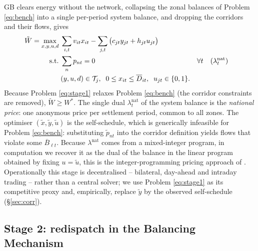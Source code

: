 \documentclass[review,3p,times]{elsarticle}
\theoremstyle{plain}
\theoremstyle{definition}
\begin{document}
GB clears energy without the network, collapsing the zonal balances of
Problem \eqref{eq:bench} into a single per-period system balance, and dropping the
corridors and their flows, gives
\begin{align}
\tilde W=\max_{x,y,u,d}\;& \sum_{i,t} v_{it}x_{it}-\sum_{j,t}\big(c_{jt}y_{jt}+h_{jt}u_{jt}\big)
\label{eq:stage1}\\
\text{s.t.}\;& \sum_{n} p_{nt}=0
   && \forall t\quad(\lambda^{\mathrm{nat}}_t) \notag\\
& (y,u,d)\in\mathcal T_j,\;\; 0\le x_{it}\le\overline D_{it},\;\; u_{jt}\in\{0,1\}.
   && \notag
\end{align}
Because Problem \eqref{eq:stage1} relaxes Problem \eqref{eq:bench} (the corridor constraints are
removed), $\tilde W\ge W^\ast$. The single dual $\lambda^{\mathrm{nat}}_t$ of the
system balance is the \emph{national price}: one anonymous price per settlement
period, common to all zones. The optimiser $(\tilde x,\tilde y,\tilde u)$ is the
self-schedule, which is generically infeasible for Problem \eqref{eq:bench}: substituting
$\tilde p_{nt}$ into the corridor definition yields flows that violate some
$\overline B_{\ell t}$. Because $\lambda^{\mathrm{nat}}$ comes from a
mixed-integer program, in computation we recover it as the dual of the balance
in the linear program obtained by fixing $u=\tilde u$, this is the integer-programming
pricing approach of \citet{oneill2005}. Operationally this stage is decentralised -- bilateral, day-ahead and intraday trading -- rather than a
central solver; we use Problem \eqref{eq:stage1} as its competitive proxy and,
empirically, replace $\tilde y$ by the observed self-schedule (\S\ref{sec:corr}).

\subsection{Stage 2: redispatch in the Balancing Mechanism}
\label{sec:stage2}
\end{document}
